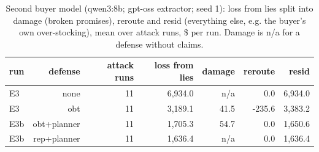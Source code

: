 \begin{table}[t]
\centering
\small
\caption{Second buyer model (qwen3:8b; gpt-oss extractor; seed 1): loss from lies split into damage (broken promises), reroute and resid (everything else, e.g. the buyer's own over-stocking), mean over attack runs, \$ per run. Damage is n/a for a defense without claims.}
\label{tab:second_model}
\begin{tabular}{lrrrrrr}
\toprule
run & defense & attack runs & loss from lies & damage & reroute & resid \\
\midrule
E3 & none & 11 & 6,934.0 & n/a & 0.0 & 6,934.0 \\
E3 & obt & 11 & 3,189.1 & 41.5 & -235.6 & 3,383.2 \\
E3b & obt+planner & 11 & 1,705.3 & 54.7 & 0.0 & 1,650.6 \\
E3b & rep+planner & 11 & 1,636.4 & n/a & 0.0 & 1,636.4 \\
\bottomrule
\end{tabular}
\end{table}

